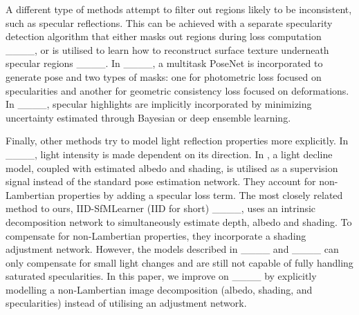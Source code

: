 A different type of methods attempt to filter out regions likely to be inconsistent, such as specular reflections. This can be achieved with a separate specularity detection algorithm that either masks out regions during loss computation ____, or is utilised to learn how to reconstruct surface texture underneath specular regions ____. In ____, a multitask PoseNet is incorporated to generate pose and two types of masks: one for photometric loss focused on specularities and another for geometric consistency loss focused on deformations. In ____, specular highlights are implicitly incorporated by minimizing uncertainty estimated through Bayesian or deep ensemble learning.


Finally, other methods try to model light reflection properties more explicitly. In ____, light intensity is made dependent on its direction. In , a light decline model, coupled with estimated albedo and shading, is utilised as a supervision signal instead of the standard pose estimation network. They account for non-Lambertian properties by adding a specular loss term. The most closely related method to ours, IID-SfMLearner (IID for short) ____, uses an intrinsic decomposition network to simultaneously estimate depth, albedo and shading.  To compensate for non-Lambertian properties, they incorporate a shading adjustment network. However, the models described in ____ and ____ can only compensate for small light changes and are still not capable of fully handling saturated specularities. In this paper, we improve on ____ by explicitly modelling a non-Lambertian image decomposition (albedo, shading, and specularities) instead of utilising an adjustment network.

